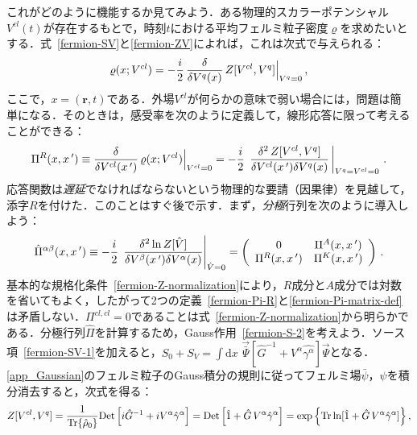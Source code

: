\documentclass[a4paper,11pt]{ltjsarticle}
\def\Tr{\mathrm{Tr}}
\def\d{\mathrm{d}}
\begin{document}
これがどのように機能するか見てみよう．ある物理的スカラーポテンシャル$V^{cl}(t)$が存在するもとで，時刻$t$における平均フェルミ粒子密度$\varrho$を求めたいとする．式~\eqref{fermion-SV}と\eqref{fermion-ZV}によれば，これは次式で与えられる：
\begin{equation}\label{fermion-density}
\varrho(x;V^{cl}) = -{i\over 2}\,{\delta \over \delta V^{q}(x)}\,
Z[V^{cl},V^q] \Big|_{V^{q}=0}\, ,
\end{equation}
ここで，$x=(\mathbf{r},t)$である．外場$V^{cl}$が何らかの意味で弱い場合には，問題は簡単になる．そのときは，感受率を次のように定義して，線形応答に限って考えることができる：
\begin{equation}\label{fermion-Pi-R}
\Pi^{R}(x,x\,') \equiv {\delta \over \delta V^{cl}(x\,')}\,
\varrho(x;V^{cl})\Big|_{V^{cl}=0} = -{i\over 2}\,\left. {\delta^2 \,
Z[V^{cl},V^q] \over \delta V^{cl}(x\,') \delta V^{q}(x)}\, \right|_{
V^q=V^{cl}=0}\, .
\end{equation}
応答関数は{\em 遅延}でなければならないという物理的な要請（因果律）を見越して，添字$R$を付けた．このことはすぐ後で示す．まず，{\em 分極}行列を次のように導入しよう：
\begin{equation} \label{fermion-Pi-matrix-def}
\hat \Pi^{\alpha\beta}(x,x\,') \equiv -{i\over 2}\, \left. {\delta^2 \ln
Z[\hat V] \over \delta V^{\beta}(x\,') \delta V^{\alpha}(x)}
\right|_{\hat V=0} = \left(\begin{array}{cc}
0   & \Pi^A(x,x\,')  \\
\Pi^R(x,x\,')  & \Pi^K(x,x\,')
\end{array}\right)\, .
\end{equation}
基本的な規格化条件~\eqref{fermion-Z-normalization}により，$R$成分と$A$成分では対数を省いてもよく，したがって2つの定義~\eqref{fermion-Pi-R}と\eqref{fermion-Pi-matrix-def}は矛盾しない．$\Pi^{cl,cl} =0$であることは式~\eqref{fermion-Z-normalization}から明らかである．分極行列$\hat{\Pi}$を計算するため，Gauss作用~\eqref{fermion-S-2}を考えよう．ソース項~\eqref{fermion-SV-1}を加えると，$S_0+S_V = \int \d x\,\,
\vec{\bar\Psi}[\hat{G}^{-1} + V^{\alpha}\hat{\gamma^{\alpha}}]
\vec{\Psi}$となる．\ref{app_Gaussian}のフェルミ粒子のGauss積分の規則に従ってフェルミ場$\bar\psi$，$\psi$を積分消去すると，次式を得る：
\begin{equation} \label{fermion-Z-trlog}
 Z[V^{cl},V^{q}]={1\over \Tr{\{\hat\rho_0}\}}\mathrm{Det}
 \left[i\hat{G}^{-1}+ iV^\alpha\hat{\gamma}^\alpha\right]=
\mathrm{Det}\left[\hat 1+\hat{G}\, V^{\alpha}\hat{\gamma}^{\alpha}
\right]=\exp\left\{\Tr\ln[\hat 1 + \hat{G}\,
V^{\alpha}\hat{\gamma}^\alpha]\right\} ,
\end{equation}
\end{document}
